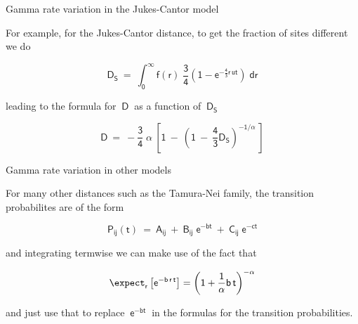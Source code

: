 \documentclass[bluish,slideColor,colorBG,pdf]{prosper}
\begin{document}
\begin{slide}[Replace]{Gamma rate variation in the Jukes-Cantor model}

For example, for the Jukes-Cantor distance, to get the fraction of sites
different we do

\[
\mathsf{D_S\  =\  \int_0^\infty f(r)\; \frac{3}{4}\left(1-e^{-\frac{4}{3}r\,ut}\right)\;dr}
\]

leading to the formula for $\mathsf{~D~}$ as a function of $\mathsf{~D_S}$

\[
\mathsf{D\ =\ -\frac{3}{4}\; \alpha\ \left[1\ -\ \left(1\ -\ \frac{4}{3}D_S \right)^{-1/\alpha}\ \right]}
\]

\end{slide}

\begin{slide}[Replace]{Gamma rate variation in other models}

For many other distances such as the Tamura-Nei family, the transition probabilites
are of the form

\[
\mathsf{P_{ij}(t)\ =\ A_{ij}\ +\ B_{ij}\;e^{-b t}\ +\ C_{ij}\;e^{-c t}}
\]

and integrating termwise we can make use of the fact that

\[
\mathsf{\expect_r\left[e^{-b\, r\, t} \right]  =  \left(1 + \frac{1}{\alpha}
b\,t \right)^{-\alpha}}
\]
\bigskip

and just use that to replace $\ \mathsf{e^{-bt}}\ $ in the formulas for the
transition probabilities.

\end{slide}
\end{document}
